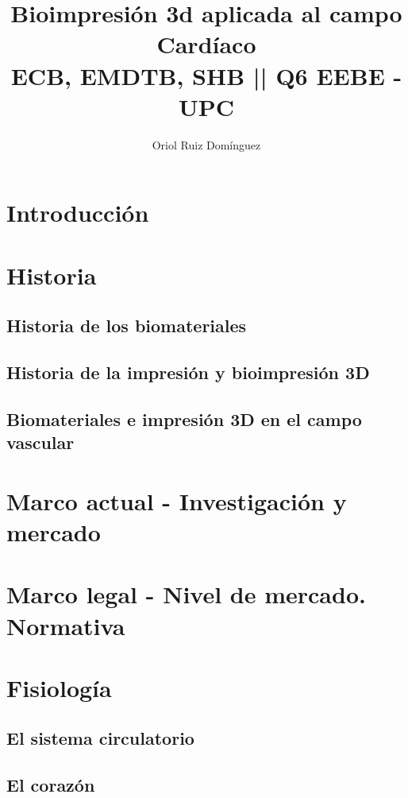 \documentclass[a4paper,12pt]{article}
\title{\textbf{Bioimpresi\'{o}n 3d aplicada al campo Card\'{i}aco}\\\large{ECB, EMDTB, SHB || Q6 EEBE - UPC}}
\author{Oriol Ruiz Dom\'{i}nguez}
\begin{document}
\maketitle
\pagebreak
\tableofcontents
\pagebreak
\listoffigures
\pagebreak


\pagebreak
\section{Introducción}

\pagebreak
\section{Historia}

\subsection{Historia de los biomateriales}

\subsection{Historia de la impresión y bioimpresión 3D}

\subsection{Biomateriales e impresión 3D en el campo vascular}

\pagebreak
\section{Marco actual - Investigación y mercado}

\pagebreak
\section{Marco legal - Nivel de mercado. Normativa}

\pagebreak
\section{Fisiología}

\subsection{El sistema circulatorio}

\subsection{El corazón}
\end{document}
